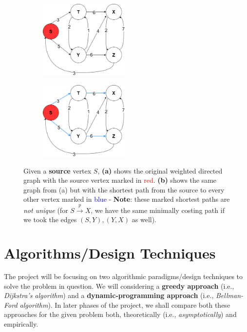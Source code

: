 \documentclass[a4paper]{article}
\begin{document}
\begin{figure}[H]
    \begin{center}
      \begin{subfigure}{.5\textwidth}
        \includegraphics[width=1.75in]{single_source_original.png}
        \caption{}
      \end{subfigure}%
      \begin{subfigure}{.4\textwidth}
        \includegraphics[width=1.75in]{single_source_solved.png}
        \caption{}
      \end{subfigure}
    \end{center}
    \caption{Given a \textbf{source} vertex \(S\), \textbf{(a)} shows the original weighted directed graph with the source vertex marked in \textcolor{red}{red}. \textbf{(b)} shows the same graph from (a) but with the shortest path from the source to every other vertex marked in \textcolor{blue}{blue} - \textbf{Note}: these marked shortest paths are \emph{not unique} (for $S \xrightarrow{p} X$, we have the same minimally costing path if we took the edges \((S, Y), (Y, X)\) as well).\cite{cormenBk}}
    \label{fig:single-soruce}
\end{figure}

\section{Algorithms/Design Techniques}
The project will be focusing on two algorithmic paradigms/design techniques to solve the problem in question. We will considering a \textbf{greedy approach} (i.e., \textit{Dijkstra's algorithm}) and a \textbf{dynamic-programming approach} (i.e., \textit{Bellman-Ford algorithm}).
In later phases of the project, we shall compare both these approaches for the given problem both, theoretically (i.e., \emph{asymptotically}) and empirically.
\end{document}
